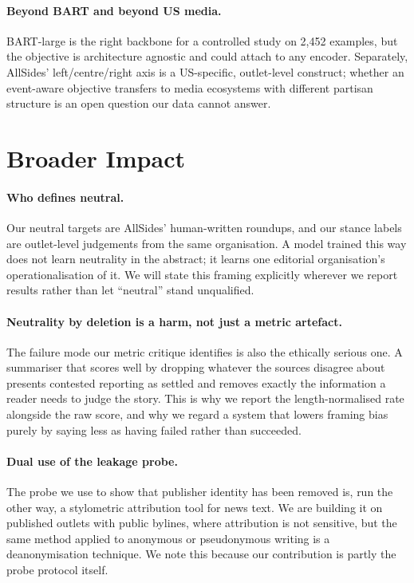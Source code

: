 \documentclass[11pt]{article}
\begin{document}
\paragraph{Beyond BART and beyond US media.} BART-large is the right backbone
for a controlled study on 2{,}452 examples, but the objective is architecture
agnostic and could attach to any encoder. Separately, AllSides' left/centre/right
axis is a US-specific, outlet-level construct; whether an event-aware objective
transfers to media ecosystems with different partisan structure is an open
question our data cannot answer.

\section{Broader Impact}

\paragraph{Who defines neutral.} Our neutral targets are AllSides' human-written
roundups, and our stance labels are outlet-level judgements from the same
organisation. A model trained this way does not learn neutrality in the
abstract; it learns one editorial organisation's operationalisation of it. We
will state this framing explicitly wherever we report results rather than let
``neutral'' stand unqualified.

\paragraph{Neutrality by deletion is a harm, not just a metric artefact.} The
failure mode our metric critique identifies is also the ethically serious one. A
summariser that scores well by dropping whatever the sources disagree about
presents contested reporting as settled and removes exactly the information a
reader needs to judge the story. This is why we report the length-normalised
rate alongside the raw score, and why we regard a system that lowers framing
bias purely by saying less as having failed rather than succeeded.

\paragraph{Dual use of the leakage probe.} The probe we use to show that
publisher identity has been removed is, run the other way, a stylometric
attribution tool for news text. We are building it on published outlets with
public bylines, where attribution is not sensitive, but the same method applied
to anonymous or pseudonymous writing is a deanonymisation technique. We note
this because our contribution is partly the probe protocol itself.
\end{document}
